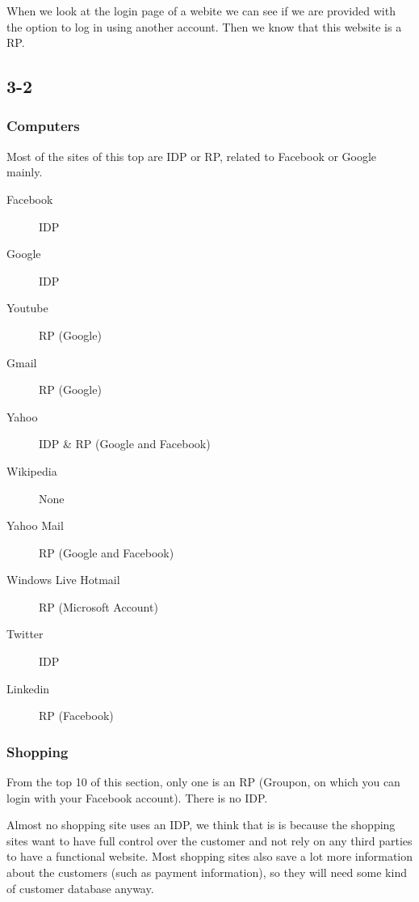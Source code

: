 \documentclass[12pt]{article}
\begin{document}
When we look at the login page of a webite we can see if we are provided with the option to log in using another account. Then we know that this website is a RP. 

\subsection*{3-2}

\begin{minipage}[t]{0.5\textwidth}

\subsubsection*{Computers}

Most of the sites of this top are IDP or RP, related to Facebook or Google mainly.

\begin{description}
\item[Facebook] IDP
\item[Google] IDP
\item[Youtube] RP (Google)
\item[Gmail] RP (Google)
\item[Yahoo] IDP & RP (Google and Facebook)
\item[Wikipedia] None
\item[Yahoo Mail] RP (Google and Facebook)
\item[Windows Live Hotmail] RP (Microsoft Account)
\item[Twitter] IDP
\item[Linkedin] RP (Facebook)
\end{description}
\end{minipage}
\begin{minipage}[t]{0.5\textwidth}

\subsubsection*{Shopping}

From the top 10 of this section, only one is an RP (Groupon, on which you can login with your Facebook account). There is no IDP.

\end{minipage}

Almost no shopping site uses an IDP, we think that is is because the shopping sites want to have full control over the customer and not rely on any third parties to have a functional website. Most shopping sites also save a lot more information about the customers (such as payment information), so they will need some kind of customer database anyway.
\end{document}
